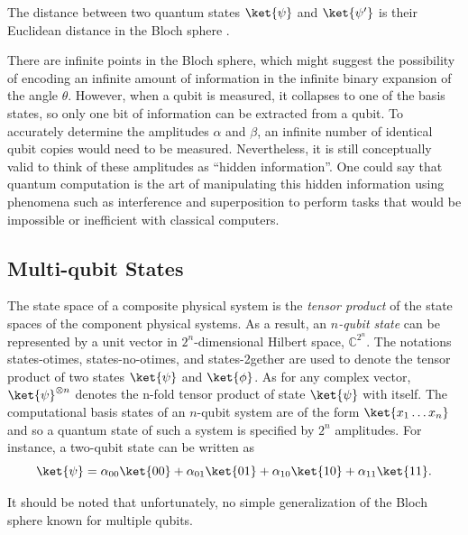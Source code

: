 The distance between two quantum states $\ket{\psi}$ and $\ket{\psi'}$ is their Euclidean distance in the Bloch sphere \cite{wallman2016noise,nielsen2010quantum}. 

There are infinite points in the Bloch sphere, which might suggest the possibility of encoding an infinite amount of information in the infinite binary expansion of the angle $\theta$. However, when a qubit is measured, it collapses to one of the basis states, so only one bit of information can be extracted from a qubit. To accurately determine the amplitudes $\alpha$ and $\beta$, an infinite number of identical qubit copies would need to be measured. Nevertheless, it is still conceptually valid to think of these amplitudes as ``hidden information''. One could say that quantum computation is the art of manipulating this hidden information using phenomena such as interference and superposition to perform tasks that would be impossible or inefficient with classical computers.



\subsection{Multi-qubit States} \label{subsec:entanglement}

\begin{definition}
 The state space of a composite physical system is the \emph{tensor product} of the state spaces of the component physical systems. As a result, an $n$\emph{-qubit state} can be represented by a unit vector in $2^n$-dimensional Hilbert space, $\mathbb{C}^{2^{n}}$. The notations \gls{states-otimes}, \gls{states-no-otimes}, and \gls{states-2gether} are  used to denote the tensor product of two states $\ket{\psi}$ and $\ket{\phi}$. As for any complex vector, $\ket{\psi}^{\otimes n}$ denotes the n-fold tensor product of state $\ket{\psi}$ with itself. The computational basis states of an $n$-qubit system are of the form $\ket{x_{1}\ldots x_{n}}$ and so a quantum state of such a system is specified by $2^{n}$ amplitudes. For instance, a two-qubit state can be written as
\begin{equation*}
  \ket{\psi} = \alpha_{00}\ket{00} + \alpha_{01}\ket{01} + \alpha_{10}\ket{10} + \alpha_{11}\ket{11}.
\end{equation*}
\end{definition}
It should be noted that unfortunately, no simple generalization of the Bloch sphere known for multiple qubits.

